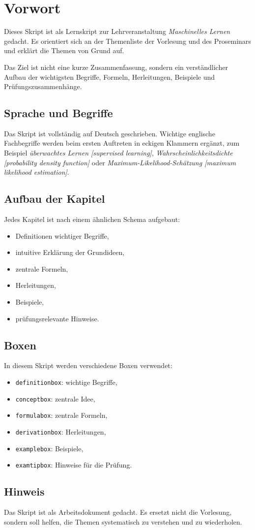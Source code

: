 \chapter*{Vorwort}

Dieses Skript ist als Lernskript zur Lehrveranstaltung \emph{Maschinelles Lernen}
gedacht. Es orientiert sich an der Themenliste der Vorlesung und des Proseminars und erklärt die Themen
von Grund auf.

Das Ziel ist nicht eine kurze Zusammenfassung, sondern ein verständlicher Aufbau der
wichtigsten Begriffe, Formeln, Herleitungen, Beispiele und Prüfungszusammenhänge.

\section*{Sprache und Begriffe}

Das Skript ist vollständig auf Deutsch geschrieben. Wichtige englische Fachbegriffe werden beim ersten Auftreten
in eckigen Klammern ergänzt, zum Beispiel \emph{überwachtes Lernen [supervised learning]},
\emph{Wahrscheinlichkeitsdichte [probability density function]} oder
\emph{Maximum-Likelihood-Schätzung [maximum likelihood estimation]}.

\section*{Aufbau der Kapitel}

Jedes Kapitel ist nach einem ähnlichen Schema aufgebaut:
\begin{itemize}
    \item Definitionen wichtiger Begriffe,
    \item intuitive Erklärung der Grundideen,
    \item zentrale Formeln,
    \item Herleitungen,
    \item Beispiele,
    \item prüfungsrelevante Hinweise.
\end{itemize}

\section*{Boxen}

In diesem Skript werden verschiedene Boxen verwendet:
\begin{itemize}
    \item \texttt{definitionbox}: wichtige Begriffe,
    \item \texttt{conceptbox}: zentrale Idee,
    \item \texttt{formulabox}: zentrale Formeln,
    \item \texttt{derivationbox}: Herleitungen,
    \item \texttt{examplebox}: Beispiele,
    \item \texttt{examtipbox}: Hinweise für die Prüfung.
\end{itemize}

\section*{Hinweis}

Das Skript ist als Arbeitsdokument gedacht. Es ersetzt nicht die Vorlesung,
sondern soll helfen, die Themen systematisch zu verstehen und zu wiederholen.
